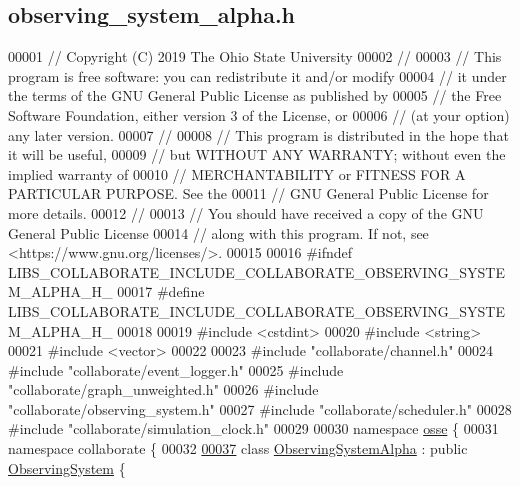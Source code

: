\hypertarget{observing__system__alpha_8h_source}{}\subsection{observing\+\_\+system\+\_\+alpha.\+h}
\label{observing__system__alpha_8h_source}

\begin{DoxyCode}
00001 \textcolor{comment}{// Copyright (C) 2019 The Ohio State University}
00002 \textcolor{comment}{//}
00003 \textcolor{comment}{// This program is free software: you can redistribute it and/or modify}
00004 \textcolor{comment}{// it under the terms of the GNU General Public License as published by}
00005 \textcolor{comment}{// the Free Software Foundation, either version 3 of the License, or}
00006 \textcolor{comment}{// (at your option) any later version.}
00007 \textcolor{comment}{//}
00008 \textcolor{comment}{// This program is distributed in the hope that it will be useful,}
00009 \textcolor{comment}{// but WITHOUT ANY WARRANTY; without even the implied warranty of}
00010 \textcolor{comment}{// MERCHANTABILITY or FITNESS FOR A PARTICULAR PURPOSE.  See the}
00011 \textcolor{comment}{// GNU General Public License for more details.}
00012 \textcolor{comment}{//}
00013 \textcolor{comment}{// You should have received a copy of the GNU General Public License}
00014 \textcolor{comment}{// along with this program.  If not, see <https://www.gnu.org/licenses/>.}
00015 
00016 \textcolor{preprocessor}{#ifndef LIBS\_COLLABORATE\_INCLUDE\_COLLABORATE\_OBSERVING\_SYSTEM\_ALPHA\_H\_}
00017 \textcolor{preprocessor}{#define LIBS\_COLLABORATE\_INCLUDE\_COLLABORATE\_OBSERVING\_SYSTEM\_ALPHA\_H\_}
00018 
00019 \textcolor{preprocessor}{#include <cstdint>}
00020 \textcolor{preprocessor}{#include <string>}
00021 \textcolor{preprocessor}{#include <vector>}
00022 
00023 \textcolor{preprocessor}{#include "collaborate/channel.h"}
00024 \textcolor{preprocessor}{#include "collaborate/event\_logger.h"}
00025 \textcolor{preprocessor}{#include "collaborate/graph\_unweighted.h"}
00026 \textcolor{preprocessor}{#include "collaborate/observing\_system.h"}
00027 \textcolor{preprocessor}{#include "collaborate/scheduler.h"}
00028 \textcolor{preprocessor}{#include "collaborate/simulation\_clock.h"}
00029 
00030 \textcolor{keyword}{namespace }\hyperlink{namespaceosse}{osse} \{
00031 \textcolor{keyword}{namespace }collaborate \{
00032 
\hyperlink{classosse_1_1collaborate_1_1_observing_system_alpha}{00037} \textcolor{keyword}{class }\hyperlink{classosse_1_1collaborate_1_1_observing_system_alpha}{ObservingSystemAlpha} : \textcolor{keyword}{public} \hyperlink{classosse_1_1collaborate_1_1_observing_system}{ObservingSystem} \{

\end{DoxyCode}
